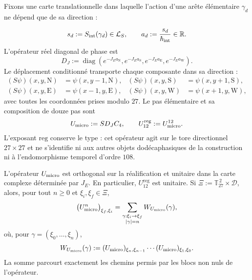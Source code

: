 Fixons une carte translationnelle dans laquelle l’action d’une arête élémentaire
\(\gamma_d\) ne dépend que de sa direction :

\[
 s_d:=S_{\rm int}(\gamma_d)\in\mathcal L_S,
 \qquad
 a_d:=\frac{s_d}{\hbar_{\rm int}}\in\mathbb R.
\]
L’opérateur réel diagonal de phase est
\[
 D_J:=\operatorname{diag}
 \left(
  e^{-J_Ea_{\mathrm N}},
  e^{-J_Ea_{\mathrm S}},
  e^{-J_Ea_{\mathrm E}},
  e^{-J_Ea_{\mathrm W}}
 \right).
\]
Le déplacement conditionné transporte chaque composante dans sa direction :
\begin{align*}
 (S\psi)(x,y,\mathrm N)&=\psi(x,y-1,\mathrm N),&
 (S\psi)(x,y,\mathrm S)&=\psi(x,y+1,\mathrm S),\\
 (S\psi)(x,y,\mathrm E)&=\psi(x-1,y,\mathrm E),&
 (S\psi)(x,y,\mathrm W)&=\psi(x+1,y,\mathrm W),
\end{align*}
avec toutes les coordonnées prises modulo \(27\). Le pas élémentaire et sa
composition de douze pas sont
\begin{equation}
 U_{\rm micro}:=S D_J C_4,
 \qquad
 U_{12}^{\mathrm{reg}}:=U_{\rm micro}^{12}.
 \label{x_reciprocidad:eq:paso-unitario-registro-27-rev3}
\end{equation}
L’exposant \(\mathrm{reg}\) conserve le type : cet opérateur agit sur
le tore directionnel \(27\times27\) et ne s’identifie ni aux autres objets
dodécaphasiques de la construction ni à l’endomorphisme temporel d’ordre \(108\).

\begin{proposition}
\label{x_reciprocidad:prop:unitariedad-suma-registro-27-rev3}
L'opérateur \(U_{\rm micro}\) est orthogonal sur la réalification et unitaire dans la carte complexe déterminée par \(J_E\). En particulier, \(U_{12}^{\mathrm{reg}}\) est unitaire. Si \(\Xi:=\mathbb T_{27}^{\,2}\times\mathcal D\), alors, pour tout \(n\geq0\) et \(\xi_i,\xi_f\in\Xi\),
\[
 \bigl(U_{\rm micro}^{n}\bigr)_{\xi_f,\xi_i}
 =
 \sum_{\substack{\gamma:\xi_i\to\xi_f\\|\gamma|=n}}
 W_{U_{\rm micro}}(\gamma),
\]
où, pour \(\gamma=(\xi_0,\ldots,\xi_n)\),
\[
 W_{U_{\rm micro}}(\gamma)
 :=
 (U_{\rm micro})_{\xi_n,\xi_{n-1}}
 \cdots
 (U_{\rm micro})_{\xi_1,\xi_0}.
\]
La somme parcourt exactement les chemins permis par les blocs non nuls
de l’opérateur.
\end{proposition}

